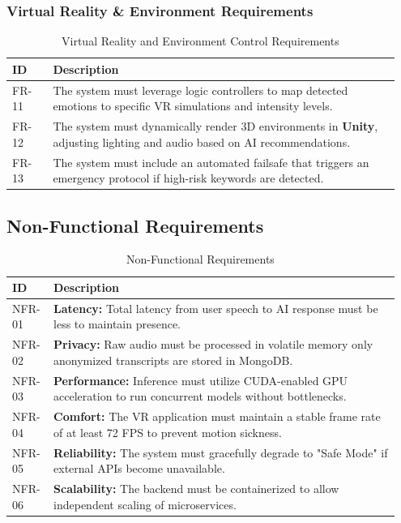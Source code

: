 \subsubsection{Virtual Reality \& Environment Requirements}
\begin{table}[H]
\centering
\renewcommand{\arraystretch}{1.3}
\caption{Virtual Reality and Environment Control Requirements}
\label{tab:func-vr}
\begin{tabular}{|p{0.1\linewidth}|p{0.85\linewidth}|}
\hline
\rowcolor{gray!15} \textbf{ID} & \textbf{Description} \\ \hline
FR-11 & The system must leverage logic controllers to map detected emotions to specific VR simulations and intensity levels. \\ \hline
FR-12 & The system must dynamically render 3D environments in \textbf{Unity}, adjusting lighting and audio based on AI recommendations. \\ \hline
FR-13 & The system must include an automated failsafe that triggers an emergency protocol if high-risk keywords are detected. \\ \hline
\end{tabular}
\end{table}

\subsection{Non-Functional Requirements}
\begin{table}[H]
\centering
\renewcommand{\arraystretch}{1.3}
\caption{Non-Functional Requirements}
\label{tab:non-functional-req}
\begin{tabular}{|p{0.1\linewidth}|p{0.85\linewidth}|}
\hline
\rowcolor{gray!15} \textbf{ID} & \textbf{Description} \\ \hline
NFR-01 & \textbf{Latency:} Total latency from user speech to AI response must be less to maintain presence. \\ \hline
NFR-02 & \textbf{Privacy:} Raw audio must be processed in volatile memory only anonymized transcripts are stored in MongoDB. \\ \hline
NFR-03 & \textbf{Performance:} Inference must utilize CUDA-enabled GPU acceleration to run concurrent models without bottlenecks. \\ \hline
NFR-04 & \textbf{Comfort:} The VR application must maintain a stable frame rate of at least 72 FPS to prevent motion sickness. \\ \hline
NFR-05 & \textbf{Reliability:} The system must gracefully degrade to "Safe Mode" if external APIs become unavailable. \\ \hline
NFR-06 & \textbf{Scalability:} The backend must be containerized to allow independent scaling of microservices. \\ \hline
\end{tabular}
\end{table}

